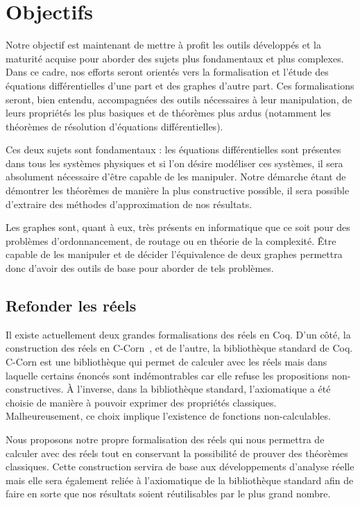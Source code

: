 \documentclass[11pt]{article}
\begin{document}
\section{Objectifs}

Notre objectif est maintenant de mettre à profit les outils développés et la maturité acquise pour aborder des sujets plus fondamentaux et plus complexes. Dans ce cadre, nos efforts seront orientés vers la formalisation et l'étude des équations différentielles d'une part et des graphes d'autre part. Ces formalisations seront, bien entendu, accompagnées des outils nécessaires à leur manipulation, de leurs propriétés les plus basiques et de théorèmes plus ardus (notamment les théorèmes de résolution d'équations différentielles).

Ces deux sujets sont fondamentaux : les équations différentielles sont présentes dans tous les systèmes physiques et si l'on désire modéliser ces systèmes, il sera absolument nécessaire d'être capable de les manipuler. Notre démarche étant de démontrer les théorèmes de manière la plus constructive possible, il sera possible d'extraire des méthodes d'approximation de nos résultats.

Les graphes sont, quant à eux, très présents en informatique que ce soit pour des problèmes d'ordonnancement, de routage ou en théorie de la complexité. Être capable de les manipuler et de décider l'équivalence de deux graphes permettra donc d'avoir des outils de base pour aborder de tels problèmes.

\subsection{Refonder les réels}
Il existe actuellement deux grandes formalisations des réels en Coq. D'un côté, la construction des réels en C-Corn~\cite{C-Corn}, et de l'autre, la bibliothèque standard de Coq. C-Corn est une bibliothèque qui permet de calculer avec les réels mais dans laquelle certains énoncés sont indémontrables car elle refuse les propositions non-constructives. À l'inverse, dans la bibliothèque standard, l'axiomatique a été choisie de manière à pouvoir exprimer des propriétés classiques. Malheureusement, ce choix implique l'existence de fonctions non-calculables.

Nous proposons notre propre formalisation des réels qui nous permettra de calculer avec des réels tout en conservant la possibilité de prouver des théorèmes classiques. Cette construction servira de base aux développements d'analyse réelle mais elle sera également reliée à l'axiomatique de la bibliothèque standard afin de faire en sorte que nos résultats soient réutilisables par le plus grand nombre.
\end{document}

